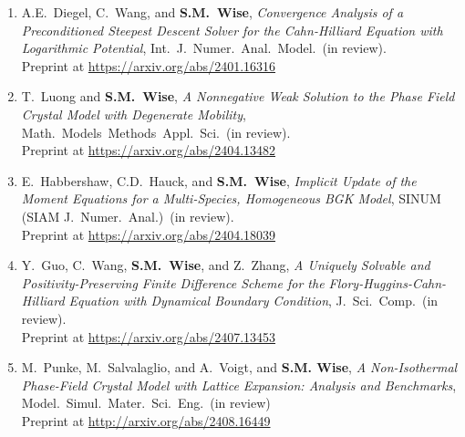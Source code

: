 \documentclass[11pt]{letter}
\begin{document}
\begin{enumerate}
	\item
A.E.~Diegel, C.~Wang, and \textbf{S.M.~Wise}, {\sl Convergence Analysis of a Preconditioned Steepest Descent Solver for the Cahn-Hilliard Equation with Logarithmic Potential}, Int.~J.~Numer.~Anal.~Model.~(in review).
	\\
Preprint at \url{https://arxiv.org/abs/2401.16316}

	\item
T.~Luong and \textbf{S.M.~Wise}, {\sl A Nonnegative Weak Solution to the Phase Field Crystal Model with Degenerate Mobility}, Math.~Models~Methods~Appl.~Sci.~(in review).
	\\
Preprint at \url{https://arxiv.org/abs/2404.13482}

	\item
E.~Habbershaw, C.D.~Hauck, and \textbf{S.M.~Wise}, {\sl Implicit Update of the Moment Equations for a Multi-Species, Homogeneous BGK Model}, SINUM (SIAM J.~Numer.~Anal.)~(in review).
	\\
Preprint at \url{https://arxiv.org/abs/2404.18039}

	\item
Y.~Guo, C.~Wang, \textbf{S.M.~Wise}, and Z.~Zhang, {\sl A Uniquely Solvable and Positivity-Preserving Finite Difference Scheme for the Flory-Huggins-Cahn-Hilliard Equation with Dynamical Boundary Condition}, J.~Sci.~Comp.~(in review).
	\\
Preprint at \url{https://arxiv.org/abs/2407.13453}


	\item
M.~Punke, M.~Salvalaglio, and A.~Voigt, and \textbf{S.M. Wise}, {\sl A Non-Isothermal Phase-Field Crystal Model with Lattice Expansion: Analysis and Benchmarks}, Model.~Simul.~Mater.~Sci.~Eng.~(in review)
	\\
Preprint at \url{http://arxiv.org/abs/2408.16449}
	\end{enumerate}
	

	
\end{document}
